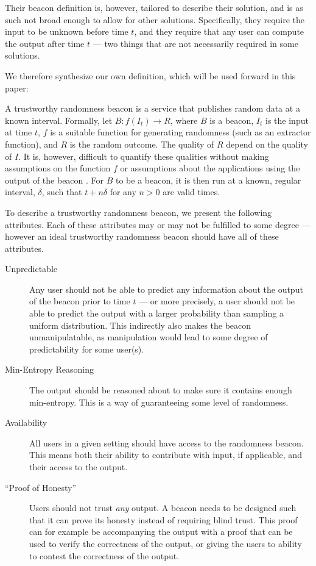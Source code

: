 Their beacon definition is, however, tailored to describe their solution, and is as such not broad enough to allow for other solutions.
Specifically, they require the input to be unknown before time $t$, and they require that any user can compute the output after time $t$ --- two things that are not necessarily required in some solutions.

We therefore synthesize our own definition, which will be used forward in this paper:

A trustworthy randomness beacon is a service that publishes random data at a known interval.
Formally, let $B: f(I_t) \rightarrow R$, where $B$ is a beacon, $I_t$ is the input at time $t$, $f$ is a suitable function for generating randomness (such as an extractor function), and $R$ is the random outcome.
The quality of $R$ depend on the quality of $I$. It is, however, difficult to quantify these qualities without making assumptions on the function $f$ or assumptions about the applications using the output of the beacon .
For $B$ to be a beacon, it is then run at a known, regular interval, $\delta$, such that $t+n\delta$ for any $n>0$ are valid times.

To describe a trustworthy randomness beacon, we present the following attributes. Each of these attributes may or may not be fulfilled to some degree --- however an ideal trustworthy randomness beacon should have all of these attributes.

\begin{description}
    \item[Unpredictable] Any user should not be able to predict any information about the output of the beacon prior to time $t$ --- or more precisely, a user should not be able to predict the output with a larger probability than sampling a uniform distribution. This indirectly also makes the beacon unmanipulatable, as manipulation would lead to some degree of predictability for some user(s).
    \item[Min-Entropy Reasoning] The output should be reasoned about to make sure it contains enough min-entropy. This is a way of guaranteeing some level of randomness.
    \item[Availability] All users in a given setting should have access to the randomness beacon.
    This means both their ability to contribute with input, if applicable, and their access to the output.
    \item[``Proof of Honesty''] Users should not trust \emph{any} output. A beacon needs to be designed such that it can prove its honesty instead of requiring blind trust. This proof can for example be accompanying the output with a proof that can be used to verify the correctness of the output, or giving the users to ability to contest the correctness of the output.
\end{description}

